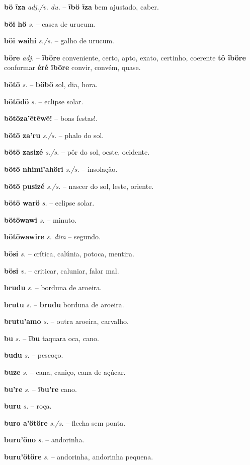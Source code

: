 \textbf{bö ĩza} \textit{adj./v. du.} -- \textbf{ĩbö ĩza} bem ajustado, caber.

\textbf{böi hö} \textit{s.} -- casca de urucum.

\textbf{böi waihi} \textit{s./s.} -- galho de urucum.

\textbf{böre} \textit{adj.} -- \textbf{ĩböre} conveniente, certo, apto, exato, certinho, coerente  \textbf{tô ĩböre} conformar  \textbf{éré ĩböre} convir, convém, quase.

\textbf{bötö} \textit{s.} -- \textbf{böbö} sol, dia, hora.

\textbf{bötödö} \textit{s.} -- eclipse solar.

\textbf{bötöza'ẽtẽwẽ!} -- boas festas!.

\textbf{bötö za'ru} \textit{s./s.} -- phalo do sol.

\textbf{bötö zasizé} \textit{s./s.} -- pôr do sol, oeste, ocidente.

\textbf{bötö nhimi'ahöri} \textit{s./s.} -- insolação.

\textbf{bötö pusizé} \textit{s./s.} -- nascer do sol, leste, oriente.

\textbf{bötö warö} \textit{s.} -- eclipse solar.

\textbf{bötöwawi} \textit{s.} -- minuto.

\textbf{bötöwawire} \textit{s. dim} -- segundo.

\textbf{bösi} \textit{s.} -- crítica, calúnia, potoca, mentira.

\textbf{bösi} \textit{v.} -- criticar, caluniar, falar mal.

\textbf{brudu} \textit{s.} -- borduna de aroeira.

\textbf{brutu} \textit{s.} -- \textbf{brudu} borduna de aroeira.

\textbf{brutu'amo} \textit{s.} -- outra aroeira, carvalho.

\textbf{bu} \textit{s.} -- \textbf{ĩbu} taquara oca, cano.

\textbf{budu} \textit{s.} -- pescoço.

\textbf{buze} \textit{s.} -- cana, caniço, cana de açúcar.

\textbf{bu're} \textit{s.} -- \textbf{ĩbu're} cano.

\textbf{buru} \textit{s.} -- roça.

\textbf{buro a'ötöre} \textit{s./s.} -- flecha sem ponta.

\textbf{buru'öno} \textit{s.} -- andorinha.

\textbf{buru'ötöre} \textit{s.} -- andorinha, andorinha pequena.


